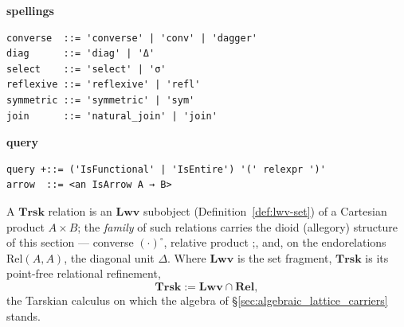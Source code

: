 \documentclass[11pt, a4paper]{article}
\begin{document}
\begin{listing}[htbp]
\vspace{0.6em}
\noindent
\begin{minipage}[t]{0.49\linewidth}
{\footnotesize\textbf{spellings}}
\begin{verbatim}
converse  ::= 'converse' | 'conv' | 'dagger'
diag      ::= 'diag' | 'Δ'
select    ::= 'select' | 'σ'
reflexive ::= 'reflexive' | 'refl'
symmetric ::= 'symmetric' | 'sym'
join      ::= 'natural_join' | 'join'
\end{verbatim}
\end{minipage}\hfill
\begin{minipage}[t]{0.49\linewidth}
{\footnotesize\textbf{query}}
\begin{verbatim}
query +::= ('IsFunctional' | 'IsEntire') '(' relexpr ')'
arrow  ::= <an IsArrow A → B>
\end{verbatim}
\end{minipage}
\end{listing}

\begin{definition}[$\mathbf{Trsk} := \mathbf{Lwv} \cap \mathbf{Rel}$]
\label{def:trsk-rel}
A $\mathbf{Trsk}$ relation is an $\mathbf{Lwv}$ subobject (Definition~\ref{def:lwv-set}) of a Cartesian product $A \times B$; the \emph{family} of such relations carries the dioid (allegory) structure of this section --- converse $(\cdot)^{\circ}$, relative product $\mathbin{;}$, and, on the endorelations $\mathrm{Rel}(A,A)$, the diagonal unit $\Delta$.  Where $\mathbf{Lwv}$ is the set fragment, $\mathbf{Trsk}$ is its point-free relational refinement,
\begin{equation}
\label{eqn:trsk}
\mathbf{Trsk} := \mathbf{Lwv} \cap \mathbf{Rel},
\end{equation}
the Tarskian calculus on which the algebra of \S\ref{sec:algebraic_lattice_carriers} stands.
\end{definition}
\end{document}
